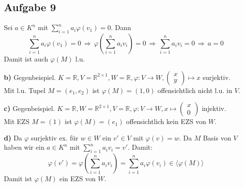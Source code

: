 \documentclass[a4paper,graphics,11pt]{article}
\newcommand{\aufgabe}[1]{\subsection*{Aufgabe #1}}
\begin{document}
 \newpage

\aufgabe{9}
Sei $a \in K^n$ mit $\sum_{i=1}^{n} a_i \varphi(v_1) = 0$. Dann
$$
    \sum_{i=1}^{n} a_i \varphi(v_1) = 0
    \,\Longrightarrow\, \varphi(\sum_{i=1}^{n} a_iv_i) = 0
    \,\Longrightarrow\, \sum_{i=1}^{n} a_iv_i = 0
    \,\Longrightarrow\, a = 0
$$
Damit ist auch $\varphi(M)$ l.u.

\textbf{b)}
Gegenbeispiel. $K = \mathbb{R}, V = \mathbb{R}^{2 \times 1}, W = \mathbb{R},
\varphi : V \to W, \begin{pmatrix}x\\y\end{pmatrix} \mapsto x$ surjektiv.\\
Mit l.u. Tupel $M = (e_1, e_2)$ ist $\varphi(M) = (1, 0)$ offensichtlich nicht l.u.
in $V$.

\textbf{c)}
Gegenbeispiel. $K = \mathbb{R}, W = \mathbb{R}^{2 \times 1}, V = \mathbb{R},
\varphi : V \to W, x \mapsto \begin{pmatrix}x\\0\end{pmatrix}$ injektiv.\\
Mit EZS $M = (1)$ ist $\varphi(M) = (e_1)$ offensichtlich kein EZS von $W$.

\textbf{d)}
Da $\varphi$ surjektiv ex. für $w \in W$ ein $v' \in V$ mit $\varphi(v) = w$.
Da $M$ Basis von $V$ haben wir ein $a \in K^n$ mit
$\sum_{i=1}^{n} a_iv_i = v'$. Damit:
$$
    \varphi(v')
    = \varphi(\sum_{i=1}^{n}a_iv_i) 
    = \sum_{i=1}^{n} a_i\varphi(v_i) \in \langle \varphi(M) \rangle
$$
Damit ist $\varphi(M)$ ein EZS von $W$.
\end{document}
